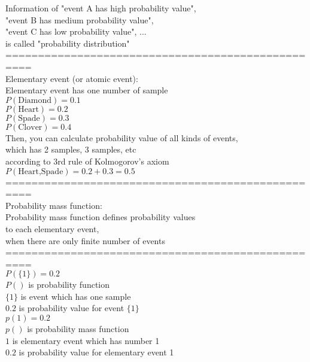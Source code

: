 \documentclass{article}
\begin{document}
Information of "event A has high probability value", \\ 
"event B has medium probability value", \\ 
"event C has low probability value", ... \\ 
is called "probability distribution" \\ 

================================================== \\
Elementary event (or atomic event): \\ 
Elementary event has one number of sample \\ 

$P({\text{Diamond}})=0.1$ \\ 
$P({\text{Heart}})=0.2$ \\ 
$P({\text{Spade}})=0.3$ \\ 
$P({\text{Clover}})=0.4$ \\ 

Then, you can calculate probability value of all kinds of events, \\ 
which has 2 samples, 3 samples, etc \\ 
according to 3rd rule of Kolmogorov's axiom \\ 

$P({\text{Heart,Spade}})=0.2+0.3=0.5$ \\ 

================================================== \\
Probability mass function: \\ 
Probability mass function defines probability values \\
to each elementary event, \\ 
when there are only finite number of events \\ 

================================================== \\
$P(\{1\})=0.2$ \\ 
$P()$ is probability function \\ 
$\{1\}$ is event which has one sample \\ 
$0.2$ is probability value for event $\{1\}$ \\ 

$p(1)=0.2$ \\ 
$p()$ is probability mass function \\ 
$1$ is elementary event which has number 1 \\ 
$0.2$ is probability value for elementary event 1 \\ 
\end{document}
